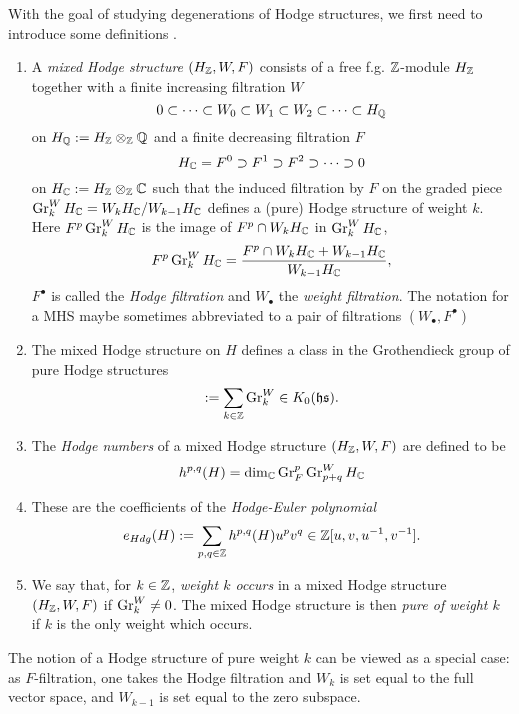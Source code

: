 \documentclass[../main.tex]{subfiles}
\begin{document}
With the goal of studying degenerations of Hodge structures, we first need to introduce some definitions .

\label{sec:2}
\begin{defn}
\begin{enumerate}
\item 
A \emph{mixed Hodge structure} $(H_{\mathbb{Z}},W,F)$ consists of a free f.g. $\mathbb{Z}$-mod\-ule $H_{\mathbb{Z}}$ together with a finite increasing filtration $W$
\[{0}\subset\cdots\subset W_0\subset W_1\subset W_2\subset \cdots\subset H_{\mathbb{Q}}\] 
on $H_{\mathbb{Q}} := H_{\mathbb{Z}}\otimes_{\mathbb{Z}}\mathbb{Q}$ and a finite decreasing filtration $F$
\[H_{\mathbb{C}} =F^0\supset F^{1}\supset F^2\supset\cdots\supset{0}\] 
on $H_{\mathbb{C}} :=H_{\mathbb{Z}}\otimes_{\mathbb{Z}}\mathbb{C}$ such that the induced filtration by $F$  on the graded piece $\operatorname{Gr}^W_k H_{\mathbb{C}}=W_{k}H_{\mathbb{C}}/W_{k-1}H_{\mathbb{C}}$ defines a (pure) Hodge structure of weight $k$. Here $F^p\operatorname{Gr}^W_k H_{\mathbb{C}}$ is the image of $F^p\cap W_k H_{\mathbb{C}}$ in $\operatorname{Gr}^W_k H_{\mathbb{C}}$,
\[
F^p\operatorname{Gr}^W_k H_{\mathbb{C}} = \frac{F^p\cap W_k H_{\mathbb{C}} + W_{k-1} H_{\mathbb{C}}}{W_{k-1} H_{\mathbb{C}}},
\]
$F^\bullet$ is called the \emph{Hodge filtration} and $W_\bullet$ the \emph{weight filtration}. The notation for a MHS maybe sometimes abbreviated to a pair of filtrations $(W_\bullet,F^\bullet)$
\item The mixed Hodge structure on $H$ defines a class in the Grothendieck group of pure Hodge structures
\begin{align}
    [H] := \sum_{k \in \Z} \Gr^W_k \in K_0(\mathfrak{hs}).\label{Groth}
\end{align}\item The \emph{Hodge numbers} of a mixed Hodge structure $(H_{\mathbb{Z}},W,F)$ are defined to be
\[h^{p,q}(H)=\dim_{\mathbb{C}} \operatorname{Gr}^p_F\operatorname{Gr}^W_{p+q}H_{\mathbb{C}}\]
\item These are the coefficients of the \emph{Hodge-Euler polynomial}
\[
e_{Hdg}(H) := \sum_{p,q \in \mathbb{Z}} h^{p,q}(H)u^pv^q \in \mathbb{Z}[u, v, u^{-1},v^{-1}]. 
\]
\item We say that, for $k \in \mathbb{Z}$, \emph{weight $k$ occurs} in a mixed Hodge structure  $(H_{\mathbb{Z}},W,F)$ if $\operatorname{Gr}^W_k \neq 0$. The mixed Hodge structure is then \emph{pure of weight $k$} if $k$ is the only weight which occurs.
\end{enumerate}
\end{defn}

The notion of a Hodge structure of pure weight $k$ can be viewed as a special case: as $F$-filtration, one takes the Hodge filtration and $W_k$ is set equal to the full vector space, and $W_{k-1}$ is set equal to the zero subspace.
\end{document}
